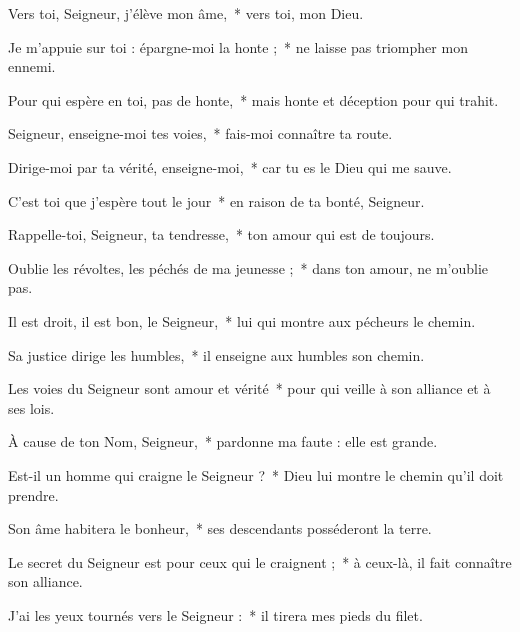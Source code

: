 \item Vers toi, Seigneur, j'élève mon âme,~* vers toi, mon Dieu.

\item Je m'appuie sur toi : épargne-moi la honte ;~* ne laisse pas triompher mon ennemi.

\item Pour qui espère en toi, pas de honte,~* mais honte et déception pour qui trahit.

\item Seigneur, enseigne-moi tes voies,~* fais-moi connaître ta route.

\item Dirige-moi par ta vérité, enseigne-moi,~* car tu es le Dieu qui me sauve.

\item C'est toi que j'espère tout le jour~* en raison de ta bonté, Seigneur.

\item Rappelle-toi, Seigneur, ta tendresse,~* ton amour qui est de toujours.

\item Oublie les révoltes, les péchés de ma jeunesse ;~* dans ton amour, ne m'oublie pas.

\item Il est droit, il est bon, le Seigneur,~* lui qui montre aux pécheurs le chemin.

\item Sa justice dirige les humbles,~* il enseigne aux humbles son chemin.

\item Les voies du Seigneur sont amour et vérité~* pour qui veille à son alliance et à ses lois.

\item À cause de ton Nom, Seigneur,~* pardonne ma faute : elle est grande.

\item Est-il un homme qui craigne le Seigneur ?~* Dieu lui montre le chemin qu'il doit prendre.

\item Son âme habitera le bonheur,~* ses descendants posséderont la terre.

\item Le secret du Seigneur est pour ceux qui le craignent ;~* à ceux-là, il fait connaître son alliance.

\item J'ai les yeux tournés vers le Seigneur :~* il tirera mes pieds du filet.

